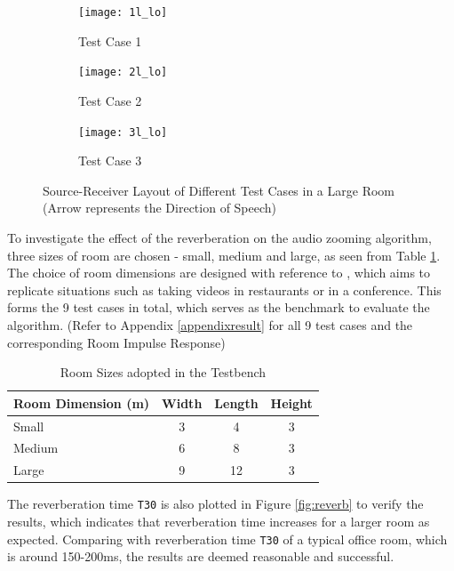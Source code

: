 \documentclass[a4paper,twoside,12pt,hidelinks]{article}
\begin{document}
\begin{figure}[H]
\centering
\begin{subfigure}[H]{0.45\textwidth}
\texttt{[image: 1l\_lo]}
\caption{Test Case 1}
\end{subfigure}
\begin{subfigure}[H]{0.45\textwidth}
\texttt{[image: 2l\_lo]}
\caption{Test Case 2}
\end{subfigure}
\begin{subfigure}[H]{0.45\textwidth}
\texttt{[image: 3l\_lo]}
\caption{Test Case 3}
\end{subfigure}
\caption{Source-Receiver Layout of Different Test Cases in a Large Room (Arrow represents the Direction of Speech)}
\label{fig:testcases}
\end{figure}

To investigate the effect of the reverberation on the audio zooming algorithm, three sizes of room are chosen - small, medium and large, as seen from Table \ref{table:roomsize}. The choice of room dimensions are designed with reference to \cite{AstolfiGoodPrivacy}, which aims to replicate situations such as taking videos in restaurants or in a conference. This forms the 9 test cases in total, which serves as the benchmark to evaluate the algorithm. (Refer to Appendix \ref{appendixresult} for all 9 test cases and the corresponding Room Impulse Response)

\begin{table}[H]
\centering
\begin{tabular}{|l|c|c|c|}
\hline
Room Dimension (m) & Width & Length & Height \\ \hline
Small & 3 & 4 & 3 \\ \hline
Medium & 6 & 8 & 3 \\ \hline
Large & 9 & 12 & 3 \\ \hline
\end{tabular}
\caption{Room Sizes adopted in the Testbench}
\label{table:roomsize}
\end{table}

The reverberation time \texttt{T30} is also plotted in Figure \ref{fig:reverb} to verify the results, which indicates that reverberation time increases for a larger room as expected. Comparing with reverberation time \texttt{T30} of a typical office room, which is around 150-200ms, the results are deemed reasonable and successful.
\end{document}
